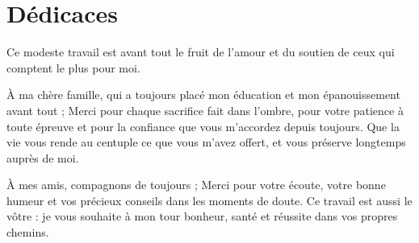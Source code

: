 \chapter*{D\'edicaces}

Ce modeste travail est avant tout le fruit de l'amour et du soutien de ceux
qui comptent le plus pour moi.

\`A ma ch\`ere famille, qui a toujours plac\'e mon \'education et mon
\'epanouissement avant tout ;
Merci pour chaque sacrifice fait dans l'ombre, pour votre patience \`a toute
\'epreuve et pour la confiance que vous m'accordez depuis toujours. Que la
vie vous rende au centuple ce que vous m'avez offert, et vous pr\'eserve
longtemps aupr\`es de moi.

\`A mes amis, compagnons de toujours ;
Merci pour votre \'ecoute, votre bonne humeur et vos pr\'ecieux conseils dans
les moments de doute. Ce travail est aussi le v\^otre : je vous souhaite \`a
mon tour bonheur, sant\'e et r\'eussite dans vos propres chemins.

